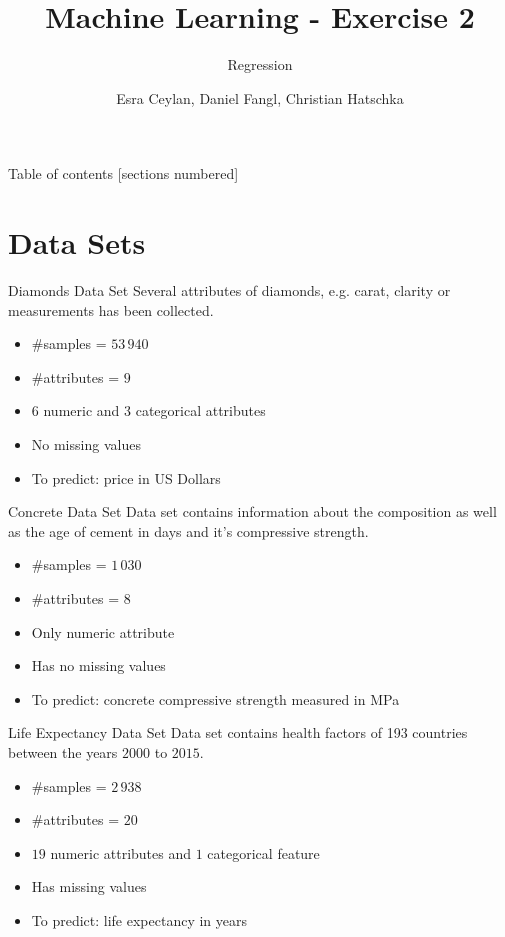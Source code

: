 \documentclass[10pt]{beamer}
\title{Machine Learning - Exercise 2}
\subtitle{Regression}
\date{}
\author{Esra Ceylan, Daniel Fangl, Christian Hatschka}
\institute{TU Wien}
\begin{document}
\maketitle

\begin{frame}{Table of contents}
  [sections numbered]
  \tableofcontents%
\end{frame}

\section[Data Sets]{Data Sets}
    \begin{frame}[fragile]{Diamonds Data Set}
        Several attributes of diamonds, e.g. carat, clarity or measurements has been collected.
        
        \begin{itemize}
            \item \#samples = $ 53\,940$
            \item \#attributes = $9$
            \item $6$ numeric and $3$ categorical attributes
            \item No missing values
            \item To predict: price in US Dollars
        \end{itemize}
    \end{frame}

    \begin{frame}[fragile]{Concrete Data Set}
        Data set contains information about the composition as well as the age of cement in days and it's compressive strength.
        \begin{itemize}
            \item \#samples = $ 1\,030$
            \item \#attributes = $8$
            \item Only numeric attribute
            \item Has no missing values
            \item To predict: concrete compressive strength measured in MPa
        \end{itemize}
    \end{frame}

    \begin{frame}[fragile]{Life Expectancy Data Set}
        Data set contains health factors of 193 countries between the years $2000$ to $2015$.
        
        \begin{itemize}
            \item \#samples = $ 2\,938$
            \item \#attributes = $20$
            \item $19$ numeric attributes and $1$ categorical feature
            \item Has missing values
            \item To predict: life expectancy in years
        \end{itemize}
    \end{frame}
    
\end{document}
